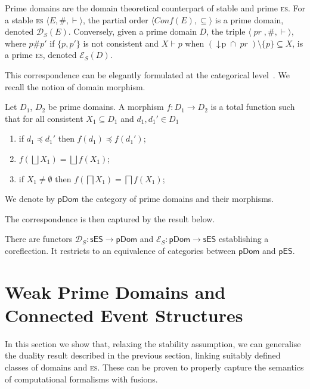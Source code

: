 \documentclass[conference]{IEEEtran}
\newcommand{\principal}[1]{\ensuremath{\mathop{\downarrow\!{#1}}}}
\newcommand{\pr}[1]{\ensuremath{\mathop{\mathit{pr}({#1})}}}
\newcommand{\esabbr}{\textsc{es}}
\newcommand{\ses}{\ensuremath{\mathsf{sES}}}
\newcommand{\pes}{\ensuremath{\mathsf{pES}}}
\newcommand{\PDom}{\ensuremath{\mathsf{pDom}}}
\newcommand{\zsev}[0]{\ensuremath{\mathcal{E}_S}}
\newcommand{\sev}[1]{\ensuremath{\zsev({#1})}}
\newcommand{\conf}[1]{\ensuremath{\mathit{Conf}({#1})}}
\newcommand{\pdom}[1]{\ensuremath{\mathcal{D}_S({#1})}}
\newcommand{\ppdom}[0]{\ensuremath{\mathcal{D}_S}}
\begin{document}
Prime domains are the domain
theoretical counterpart of stable and prime {\esabbr}.
%
For a stable {\esabbr} $\langle E, \#, \vdash \rangle$, the
partial order $\langle \conf{{E}}, \subseteq \rangle$ is
a prime  domain, denoted $\pdom{{E}}$. Conversely,
given a prime  domain $D$, the triple
$\langle \pr{D}, \#, \vdash \rangle$, where $p \# p'$ if $\{ p, p' \}$
is not consistent and $X \vdash p$ when
$(\principal{p} \cap \pr{D}) \setminus \{ p \} \subseteq X$,
is a prime {\esabbr}, denoted $\sev{D}$.


This correspondence can be elegantly formulated at the categorical
level~\cite{Win:ES}.
%
We recall the notion of domain morphism.

\begin{definition}
  \label{de:pdomain-category}
  Let $D_1$, $D_2$ be prime domains. A morphism
  $f : D_1 \to D_2$ is a total function such that
  for all consistent $X_1 \subseteq D_1$ and
  $d_1, d_1' \in D_1$
  \begin{enumerate}
  \item if $d_1 \preceq d_1'$ then $f(d_1) \preceq f(d_1')$;
  \item $f(\bigsqcup X_1) = \bigsqcup f(X_1)$;
  \item if $X_1 \neq \emptyset$ then
    $f(\bigsqcap X_1) = \bigsqcap f(X_1)$;
  \end{enumerate}
  We denote by $\PDom$ the category of prime domains and
  their morphisms.
\end{definition}

The correspondence is then captured by the result below.

\begin{theorem}[duality]
  \label{th:duality}
  There are functors $\ppdom : \ses \to \PDom$ and
  $\zsev : \PDom \to \ses$ establishing a coreflection. It restricts
  to an equivalence of categories between $\PDom$ and $\pes$.
\end{theorem}


\section{Weak Prime Domains and Connected Event Structures}
\label{se:fes}


In this section we show that, relaxing the stability assumption, we
can generalise the duality result described in the previous
section, linking suitably defined classes of domains and 
{\esabbr}. These can be proven to properly capture the
semantics of computational formalisms with fusions.
\end{document}

